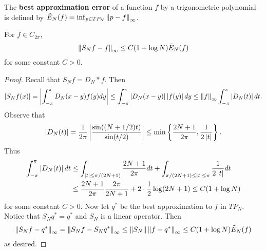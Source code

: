 \begin{definition}
    The \textbf{best approximation error} of a function $f$ by a trigonometric 
    polynomial is defined by $\tilde{E}_N(f) = \inf_{p\in TP_N}\left\lVert {p-f} \right\rVert_\infty$. 
\end{definition}

\begin{theorem}\label{thm:fourier_series_approx_loss}
    For $f\in C_{2\pi}$, 
    \begin{equation*}
        \left\lVert {S_Nf - f} \right\rVert_\infty \leq C(1+\log N)\tilde{E}_N(f)
    \end{equation*}
    for some constant $C>0$.
\end{theorem}
\begin{proof}
    Recall that $S_Nf = D_N*f$. Then
    \begin{equation*}
        \left\lvert {S_Nf(x)} \right\rvert = \left\lvert {\int_{-\pi}^\pi D_N(x-y)f(y)dy} \right\rvert \leq \int_{-\pi}^\pi \left\lvert {D_N(x-y)} \right\rvert\left\lvert {f(y)} \right\rvert dy
        \leq \left\lVert {f} \right\rVert_\infty\int_{-\pi}^\pi \left\lvert {D_N(t)} \right\rvert dt.
    \end{equation*}
    Observe that 
    \begin{equation*}
        \abs{D_N(t)} = \frac{1}{2\pi}\abs{\frac{\sin\pth{(N+1/2)t}}{\sin(t/2)}} \leq \min\set{\frac{2N+1}{2\pi}, \frac{1}{2\abs{t}}}.
    \end{equation*}
    Thus 
    \begin{equation*}
        \begin{split}
            \int_{-\pi}^{\pi} \left\lvert {D_N(t)} \right\rvert dt &\leq \int_{\left\lvert {t} \right\rvert\leq \pi/(2N+1)} \frac{2N+1}{2\pi}dt + \int_{\pi/(2N+1)\leq\left\lvert {t} \right\rvert\leq\pi} \frac{1}{2\left\lvert {t} \right\rvert}dt \\
            &\leq \frac{2N+1}{2\pi}\frac{2\pi}{2N+1} + 2\cdot\frac{1}{2}\log(2N+1) \leq C(1 + \log N)
        \end{split}
    \end{equation*}
    for some constant $C>0$. Now let $q^*$ be the best approximation to $f$ in $TP_N$. 
    Notice that $S_Nq^* = q^*$ and $S_N$ is a linear operator. Then 
    \begin{equation*}
        \left\lVert {S_Nf - q^*} \right\rVert_\infty = \left\lVert {S_Nf - S_Nq^*} \right\rVert_\infty 
        \leq \left\lVert {S_N} \right\rVert\left\lVert {f-q^*} \right\rVert_\infty \leq C(1+\log N)\tilde{E}_N(f)
    \end{equation*}
    as desired.
\end{proof}

